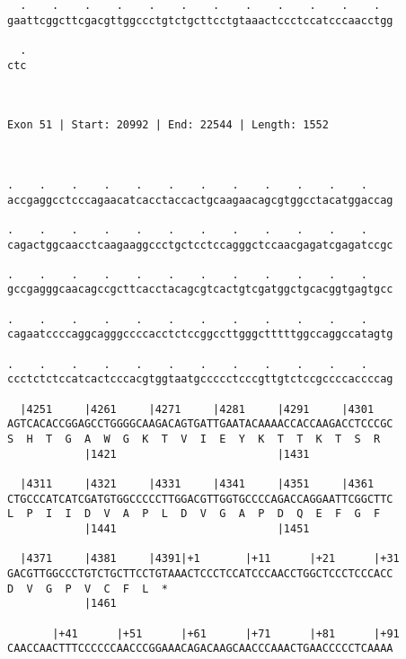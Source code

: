 \documentclass{article}
\begin{document}
\begin{Verbatim}
  .    .    .    .    .    .    .    .    .    .    .    .  
gaattcggcttcgacgttggccctgtctgcttcctgtaaactccctccatcccaacctgg
                                                            
  .
ctc
   
   
 
Exon 51 | Start: 20992 | End: 22544 | Length: 1552



.    .    .    .    .    .    .    .    .    .    .    .    
accgaggcctcccagaacatcacctaccactgcaagaacagcgtggcctacatggaccag
                                                            
.    .    .    .    .    .    .    .    .    .    .    .    
cagactggcaacctcaagaaggccctgctcctccagggctccaacgagatcgagatccgc
                                                            
.    .    .    .    .    .    .    .    .    .    .    .    
gccgagggcaacagccgcttcacctacagcgtcactgtcgatggctgcacggtgagtgcc
                                                            
.    .    .    .    .    .    .    .    .    .    .    .    
cagaatccccaggcagggccccacctctccggccttgggctttttggccaggccatagtg
                                                            
.    .    .    .    .    .    .    .    .    .    .    .    
ccctctctccatcactcccacgtggtaatgccccctcccgttgtctccgccccaccccag
                                                            
  |4251     |4261     |4271     |4281     |4291     |4301   
AGTCACACCGGAGCCTGGGGCAAGACAGTGATTGAATACAAAACCACCAAGACCTCCCGC
S  H  T  G  A  W  G  K  T  V  I  E  Y  K  T  T  K  T  S  R  
            |1421                         |1431             
  
  |4311     |4321     |4331     |4341     |4351     |4361   
CTGCCCATCATCGATGTGGCCCCCTTGGACGTTGGTGCCCCAGACCAGGAATTCGGCTTC
L  P  I  I  D  V  A  P  L  D  V  G  A  P  D  Q  E  F  G  F  
            |1441                         |1451             
  
  |4371     |4381     |4391|+1       |+11      |+21      |+31
GACGTTGGCCCTGTCTGCTTCCTGTAAACTCCCTCCATCCCAACCTGGCTCCCTCCCACC
D  V  G  P  V  C  F  L  *   
            |1461                                           
  
       |+41      |+51      |+61      |+71      |+81      |+91
CAACCAACTTTCCCCCCAACCCGGAAACAGACAAGCAACCCAAACTGAACCCCCTCAAAA
                                                            

\end{Verbatim}
\end{document}
